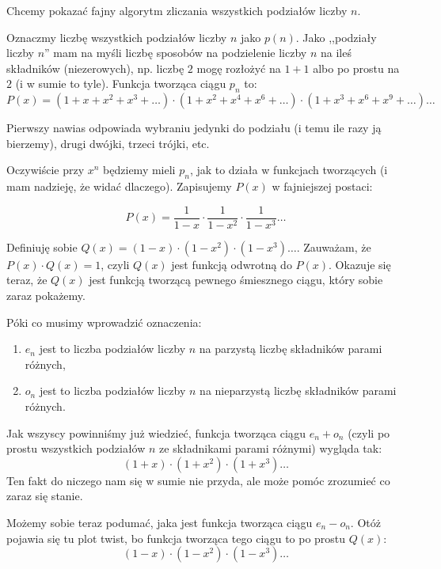 
Chcemy pokazać fajny algorytm zliczania wszystkich podziałów liczby $n$.

Oznaczmy liczbę wszystkich podziałów liczby $n$ jako $p(n)$. Jako ,,podziały liczby $n$'' mam na myśli liczbę sposobów na podzielenie liczby $n$ na ileś składników (niezerowych), np. liczbę $2$ mogę rozłożyć na $1 + 1$ albo po prostu na $2$ (i w sumie to tyle).  Funkcja tworząca ciągu $p_n$ to: \begin{equation*}
	P(x) = (1 + x + x^2 + x^3 + \dots) \cdot (1 + x^2 + x^4 + x^6 + \dots) \cdot (1 + x^3 + x^6 + x^9 + \dots) \dots
\end{equation*}

Pierwszy nawias odpowiada wybraniu jedynki do podziału (i temu ile razy ją bierzemy), drugi dwójki, trzeci trójki, etc.

Oczywiście przy $x^n$ będziemy mieli $p_n$, jak to działa w funkcjach tworzących (i mam nadzieję, że widać dlaczego). Zapisujemy $P(x)$ w fajniejszej postaci:

\begin{equation*}
	P(x) = \frac{1}{1-x} \cdot \frac{1}{1 - x^2} \cdot \frac{1}{1-x^3} \dots
\end{equation*}

Definiuję sobie $Q(x) = (1-x) \cdot (1-x^2) \cdot (1-x^3) \dots$. Zauważam, że $P(x) \cdot Q(x) = 1$, czyli $Q(x)$ jest funkcją odwrotną do $P(x)$. Okazuje się teraz, że $Q(x)$ jest funkcją tworzącą pewnego śmiesznego ciągu, który sobie zaraz pokażemy.

Póki co musimy wprowadzić oznaczenia:
\begin{enumerate}
	\item $e_n$ jest to liczba podziałów liczby $n$ na parzystą liczbę składników parami różnych,
	\item $o_n$ jest to liczba podziałów liczby $n$ na nieparzystą liczbę składników parami różnych.
\end{enumerate}
Jak wszyscy powinniśmy już wiedzieć, funkcja tworząca ciągu $e_n + o_n$ (czyli po prostu wszystkich podziałów $n$ ze składnikami parami różnymi) wygląda tak:
\begin{equation*}
	(1+x) \cdot (1 + x^2) \cdot (1+x^3) \dots
\end{equation*}
Ten fakt do niczego nam się w sumie nie przyda, ale może pomóc zrozumieć co zaraz się stanie.

Możemy sobie teraz podumać, jaka jest funkcja tworząca ciągu $e_n - o_n$. Otóż pojawia się tu plot twist, bo funkcja tworząca tego ciągu to po prostu $Q(x)$:
\begin{equation*}
	(1-x) \cdot (1-x^2) \cdot (1-x^3) \dots
\end{equation*}

